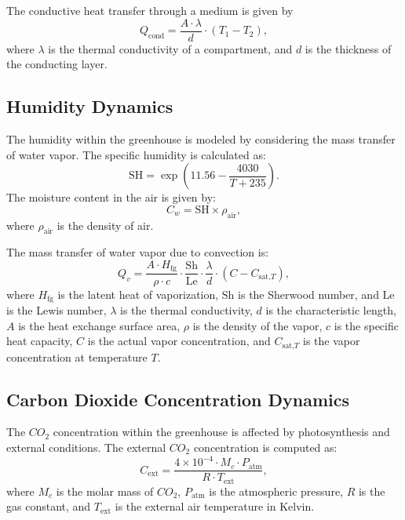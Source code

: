 \documentclass[conference]{IEEEtran}
\begin{document}
The conductive heat transfer through a medium is given by
\begin{equation}
    Q_{\text{cond}} = \frac{A \cdot \lambda}{d} \cdot (T_1 - T_2),
\end{equation}
where \(\lambda \) is the thermal conductivity of a compartment, and \(d\) is the thickness of the conducting layer.

\subsection{Humidity Dynamics}

The humidity within the greenhouse is modeled by considering the mass transfer of water vapor. The specific humidity is calculated as:
\begin{equation}
    \text{SH} = \exp\left(11.56 - \frac{4030}{T + 235}\right).
\end{equation}
The moisture content in the air is given by:
\begin{equation}
    C_w = \text{SH} \times \rho_{\text{air}},
\end{equation}
where \(\rho_{\text{air}}\) is the density of air.

The mass transfer of water vapor due to convection is:
\begin{equation}
    Q_{v} = \frac{A \cdot H_{\text{fg}}}{\rho \cdot c} \cdot \frac{\text{Sh}}{\text{Le}} \cdot \frac{\lambda}{d} \cdot \left( C - C_{\text{sat,}T} \right),
\end{equation}
where \(H_{\text{fg}}\) is the latent heat of vaporization, \(\text{Sh}\) is the Sherwood number, and \(\text{Le}\) is the Lewis number, \(\lambda \) is the thermal conductivity, \(d\) is the characteristic length, \(A\) is the heat exchange surface area, \(\rho \) is the density of the vapor, \(c\) is the specific heat capacity, \(C\) is the actual vapor concentration, and \(C_{\text{sat,}T}\) is the vapor concentration at temperature \(T\).

\subsection{Carbon Dioxide Concentration Dynamics}

The \(CO_2\) concentration within the greenhouse is affected by photosynthesis and external conditions. The external \(CO_2\) concentration is computed as:
\begin{equation}
    C_{\text{ext}} = \frac{4 \times 10^{-4} \cdot M_c \cdot P_{\text{atm}}}{R \cdot T_{\text{ext}}},
\end{equation}
where \(M_c\) is the molar mass of \(CO_2\), \(P_{\text{atm}}\) is the atmospheric pressure, \(R\) is the gas constant, and \(T_{\text{ext}}\) is the external air temperature in Kelvin.
\end{document}
